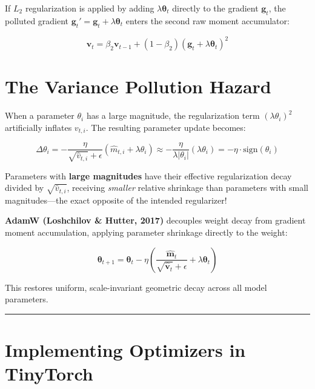 \documentclass[
  letterpaper,
]{scrbook}
\begin{document}
If \(L_2\) regularization is applied by adding
\(\lambda \mathbf{\theta}_t\) directly to the gradient \(\mathbf{g}_t\),
the polluted gradient
\(\mathbf{g}_t' = \mathbf{g}_t + \lambda \mathbf{\theta}_t\) enters the
second raw moment accumulator:

\[\mathbf{v}_t = \beta_2 \mathbf{v}_{t-1} + (1 - \beta_2) (\mathbf{g}_t + \lambda \mathbf{\theta}_t)^2\]

\section{The Variance Pollution
Hazard}\label{the-variance-pollution-hazard}

When a parameter \(\theta_i\) has a large magnitude, the regularization
term \((\lambda \theta_i)^2\) artificially inflates \(v_{t,i}\). The
resulting parameter update becomes:

\[\Delta \theta_i = -\frac{\eta}{\sqrt{\hat{v}_{t,i}} + \epsilon} (\hat{m}_{t,i} + \lambda \theta_i) \approx -\frac{\eta}{\lambda |\theta_i|} (\lambda \theta_i) = -\eta \cdot \text{sign}(\theta_i)\]

Parameters with \textbf{large magnitudes} have their effective
regularization decay divided by \(\sqrt{\hat{v}_{t,i}}\), receiving
\emph{smaller} relative shrinkage than parameters with small
magnitudes---the exact opposite of the intended regularizer!

\textbf{AdamW (Loshchilov \& Hutter, 2017)} decouples weight decay from
gradient moment accumulation, applying parameter shrinkage directly to
the weight:

\[\mathbf{\theta}_{t+1} = \mathbf{\theta}_t - \eta \left( \frac{\hat{\mathbf{m}}_t}{\sqrt{\hat{\mathbf{v}}_t} + \epsilon} + \lambda \mathbf{\theta}_t \right)\]

This restores uniform, scale-invariant geometric decay across all model
parameters.

\begin{center}\rule{0.5\linewidth}{0.5pt}\end{center}

\section{Implementing Optimizers in
TinyTorch}\label{implementing-optimizers-in-tinytorch}
\end{document}
